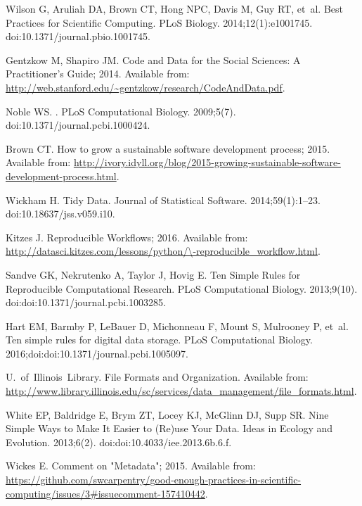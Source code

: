 \documentclass[10pt,letterpaper]{article}
\begin{document}
\begin{thebibliography}{10}

Wilson G, Aruliah DA, Brown CT, Hong NPC, Davis M, Guy RT, et~al.
\newblock Best Practices for Scientific Computing.
\newblock PLoS Biology. 2014;12(1):e1001745.
\newblock doi:{10.1371/journal.pbio.1001745}.

Gentzkow M, Shapiro JM. Code and Data for the Social Sciences: A Practitioner's
  Guide; 2014.
\newblock Available from:
  \url{http://web.stanford.edu/~gentzkow/research/CodeAndData.pdf}.

Noble WS.
.
\newblock PLoS Computational Biology. 2009;5(7).
\newblock doi:{10.1371/journal.pcbi.1000424}.

Brown CT. How to grow a sustainable software development process; 2015.
\newblock Available from:
  \url{http://ivory.idyll.org/blog/2015-growing-sustainable-software-development-process.html}.

Wickham H.
\newblock Tidy Data.
\newblock Journal of Statistical Software. 2014;59(1):1--23.
\newblock doi:{10.18637/jss.v059.i10}.

Kitzes J. Reproducible Workflows; 2016.
\newblock Available from:
  \url{http://datasci.kitzes.com/lessons/python/\-reproducible\_workflow.html}.

Sandve GK, Nekrutenko A, Taylor J, Hovig E.
\newblock Ten Simple Rules for Reproducible Computational Research.
\newblock PLoS Computational Biology. 2013;9(10).
\newblock doi:{doi:10.1371/journal.pcbi.1003285}.

Hart EM, Barmby P, LeBauer D, Michonneau F, Mount S, Mulrooney P, et~al.
\newblock Ten simple rules for digital data storage.
\newblock PLoS Computational Biology.
  2016;doi:{doi:10.1371/journal.pcbi.1005097}.

U.~of~Illinois~Library. File Formats and Organization.
\newblock Available from:
  \url{http://www.library.illinois.edu/sc/services/data\_management/file\_formats.html}.

White EP, Baldridge E, Brym ZT, Locey KJ, McGlinn DJ, Supp SR.
\newblock Nine Simple Ways to Make It Easier to (Re)use Your Data.
\newblock Ideas in Ecology and Evolution. 2013;6(2).
\newblock doi:{doi:10.4033/iee.2013.6b.6.f}.

Wickes E. Comment on "Metadata"; 2015.
\newblock Available from:
  \url{https://github.com/swcarpentry/good-enough-practices-in-scientific-computing/issues/3\#issuecomment-157410442}.


\end{thebibliography}
\end{document}
